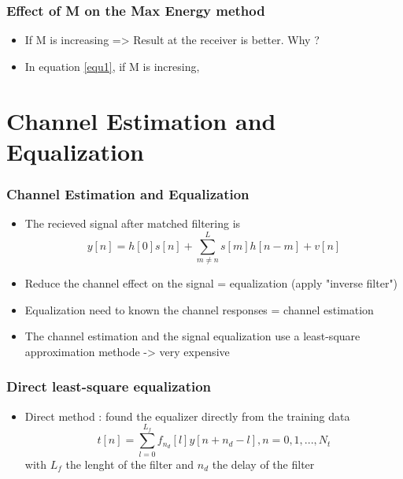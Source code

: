 \documentclass[11pt]{beamer}
\begin{document}
\begin{frame}
\frametitle{Effect of M on the Max Energy method}

\begin{itemize}

\item If M is increasing => Result at the receiver  is better. Why ?

\item In equation \ref{equ1}, if M is incresing, 



\end{itemize}



\end{frame}

\section{Channel Estimation and Equalization}
\begin{frame}
\frametitle{Channel Estimation and Equalization}
\begin{itemize}
\item The recieved signal after matched filtering is
\begin{equation}
y[n] = h[0]s[n] + \sum_{m \neq n}^{L}{s[m]h[n-m]} + v[n]
\end{equation}
\item Reduce the channel effect on the signal = equalization (apply "inverse filter")
\item Equalization need to known the channel responses = channel estimation
\item The channel estimation and the signal equalization use a least-square approximation methode -> very expensive
\end{itemize}
\end{frame}

\begin{frame}
\frametitle{Direct least-square equalization}
\begin{itemize}
\item Direct method : found the equalizer directly from the training data
\begin{equation}
t[n] = \sum_{l=0}^{L_f}{f_{n_d}[l]y[n+n_d-l]}, n = 0,1,...,N_t
\end{equation}
with $L_f$ the lenght of the filter and $n_d$ the delay of the filter

\end{itemize}
\end{frame}
\end{document}
